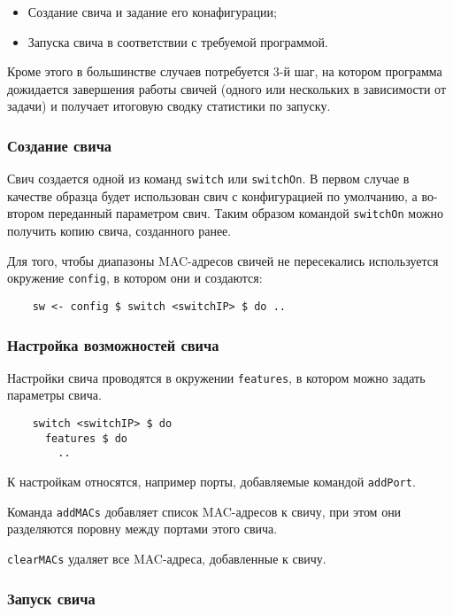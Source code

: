 \documentclass[9pt,a4paper]{article}
\begin{document}
\begin{itemize}
  \item Создание свича и задание его конафигурации;
  \item Запуска свича в соответствии с требуемой программой.
\end{itemize}

Кроме этого в большинстве случаев потребуется 3-й шаг, на котором программа дожидается
завершения работы свичей (одного или нескольких в зависимости от задачи) и получает
итоговую сводку статистики по запуску.

\subsubsection{Создание свича}

Свич создается одной из команд \lstinline!switch! или \lstinline!switchOn!. В первом случае
в качестве образца будет использован свич с конфигурацией по умолчанию, а во-втором 
переданный параметром свич. Таким образом командой \lstinline!switchOn! можно получить
копию свича, созданного ранее.

Для того, чтобы диапазоны MAC-адресов свичей не пересекались используется окружение
\lstinline!config!, в котором они и создаются:

\begin{lstlisting}
    sw <- config $ switch <switchIP> $ do ..
\end{lstlisting}%

\subsubsection{Настройка возможностей свича}

Настройки свича проводятся в окружении \lstinline!features!, в котором можно задать
параметры свича.

\begin{lstlisting}
    switch <switchIP> $ do
      features $ do
        ..
\end{lstlisting}

К настройкам относятся, например порты, добавляемые командой \lstinline!addPort!.

Команда \lstinline!addMACs! добавляет список MAC-адресов к свичу, при этом они разделяются
поровну между портами этого свича.

\lstinline!clearMACs! удаляет все MAC-адреса, добавленные к свичу.


\subsubsection{Запуск свича}
\end{document}
